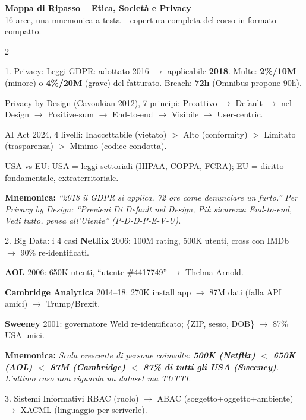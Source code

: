 \documentclass[a4paper,10pt]{article}
\newcommand{\mnem}[1]{{\color{orange!70!black}\textbf{Mnemonica:} \textit{#1}}}
\begin{document}
\begin{center}
{\Large\textbf{Mappa di Ripasso -- Etica, Societ\`{a} e Privacy}}\\[2pt]
{\small 16 aree, una mnemonica a testa -- copertura completa del corso in formato compatto.}
\end{center}
\vspace{4pt}

\begin{multicols}{2}

\begin{area}{1. Privacy: Leggi}
GDPR: adottato 2016 $\to$ applicabile \textbf{2018}. Multe: \textbf{2\%/10M} (minore) o \textbf{4\%/20M} (grave) del fatturato. Breach: \textbf{72h} (Omnibus propone 90h).

Privacy by Design (Cavoukian 2012), 7 principi: Proattivo $\to$ Default $\to$ nel Design $\to$ Positive-sum $\to$ End-to-end $\to$ Visibile $\to$ User-centric.

AI Act 2024, 4 livelli: Inaccettabile (vietato) $>$ Alto (conformity) $>$ Limitato (trasparenza) $>$ Minimo (codice condotta).

USA vs EU: USA = leggi settoriali (HIPAA, COPPA, FCRA); EU = diritto fondamentale, extraterritoriale.

\mnem{``2018 il GDPR si applica, 72 ore come denunciare un furto.'' Per Privacy by Design: \emph{``Previeni Di Default nel Design, Più sicurezza End-to-end, Vedi tutto, pensa all'Utente''} (P-D-D-P-E-V-U).}
\end{area}

\begin{area}{2. Big Data: i 4 casi}
\textbf{Netflix} 2006: 100M rating, 500K utenti, cross con IMDb $\to$ 90\% re-identificati.

\textbf{AOL} 2006: 650K utenti, ``utente \#4417749'' $\to$ Thelma Arnold.

\textbf{Cambridge Analytica} 2014--18: 270K install app $\to$ 87M dati (falla API amici) $\to$ Trump/Brexit.

\textbf{Sweeney} 2001: governatore Weld re-identificato; \{ZIP, sesso, DOB\} $\to$ 87\% USA unici.

\mnem{Scala crescente di persone coinvolte: \textbf{500K (Netflix) $<$ 650K (AOL) $<$ 87M (Cambridge) $<$ 87\% di tutti gli USA (Sweeney)}. L'ultimo caso non riguarda un dataset ma TUTTI.}
\end{area}

\begin{area}{3. Sistemi Informativi}
RBAC (ruolo) $\to$ ABAC (soggetto+oggetto+ambiente) $\to$ XACML (linguaggio per scriverle).


\end{area}
\end{multicols}
\end{document}
